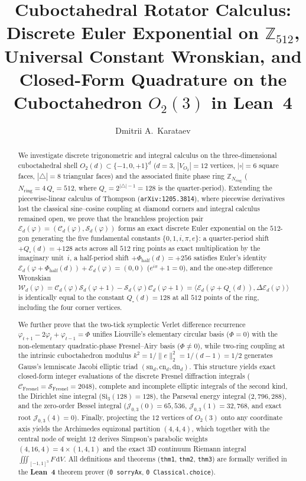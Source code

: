 \documentclass[11pt,a4paper]{article}
\title{\textbf{Cuboctahedral Rotator Calculus:\\ Discrete Euler Exponential on $\mathbb{Z}_{512}$, Universal Constant Wronskian, and Closed-Form Quadrature on the Cuboctahedron $O_2(3)$ in Lean~4}}
\author{Dmitrii A.~Karataev}
\date{}
\theoremstyle{plain}
\theoremstyle{definition}
\begin{document}
\maketitle

\begin{abstract}
We investigate discrete trigonometric and integral calculus on the three-dimensional cuboctahedral shell $O_2(d)\subset\{-1,0,+1\}^d$ ($d=3$, $|V_{O_2}|=12$ vertices, $|\square|=6$ square faces, $|\triangle|=8$ triangular faces) and the associated finite phase ring $\mathbb{Z}_{N_{\mathrm{ring}}}$ ($N_{\mathrm{ring}} = 4\,Q_\square = 512$, where $Q_\square = 2^{|\triangle|-1} = 128$ is the quarter-period). Extending the piecewise-linear calculus of Thompson (\texttt{arXiv:1205.3814}), where piecewise derivatives lost the classical sine--cosine coupling at diamond corners and integral calculus remained open, we prove that the branchless projection pair $\mathcal{E}_d(\varphi) = (\mathcal{C}_d(\varphi),\mathcal{S}_d(\varphi))$ forms an exact discrete Euler exponential on the $512$-gon generating the five fundamental constants $\{0,1,i,\pi,e\}$: a quarter-period shift $+Q_\square(d)=+128$ acts across all $512$ ring points as exact multiplication by the imaginary unit~$i$, a half-period shift $+\Phi_{\mathrm{half}}(d)=+256$ satisfies Euler's identity $\mathcal{E}_d(\varphi+\Phi_{\mathrm{half}}(d))+\mathcal{E}_d(\varphi)=(0,0)$ ($e^{i\pi}+1=0$), and the one-step difference Wronskian $\mathcal{W}_d(\varphi)=\mathcal{C}_d(\varphi)\mathcal{S}_d(\varphi+1)-\mathcal{S}_d(\varphi)\mathcal{C}_d(\varphi+1)=\langle \mathcal{E}_d(\varphi+Q_\square(d)),\Delta\mathcal{E}_d(\varphi)\rangle$ is identically equal to the constant $Q_\square(d)=128$ at all $512$ points of the ring, including the four corner vertices.

We further prove that the two-tick symplectic Verlet difference recurrence $\varphi_{t+1}-2\varphi_t+\varphi_{t-1}=\Phi$ unifies Liouville's elementary circular basis ($\Phi=0$) with the non-elementary quadratic-phase Fresnel--Airy basis ($\Phi\ne 0$), while two-ring coupling at the intrinsic cuboctahedron modulus $k^2 = 1/\|e\|_2^2 = 1/(d-1) = 1/2$ generates Gauss's lemniscate Jacobi elliptic triad $(\mathrm{sn}_d,\mathrm{cn}_d,\mathrm{dn}_d)$. This structure yields exact closed-form integer evaluations of the discrete Fresnel diffraction integrals ($\mathcal{C}_{\mathrm{Fresnel}}=\mathcal{S}_{\mathrm{Fresnel}}=2048$), complete and incomplete elliptic integrals of the second kind, the Dirichlet sine integral ($\mathrm{Si}_3(128)=128$), the Parseval energy integral ($2,796,288$), and the zero-order Bessel integral ($\mathcal{J}_{0,3}(0)=65,536$, $\mathcal{J}_{0,3}(1)=32,768$, and exact root $\mathcal{J}_{0,3}(4)=0$). Finally, projecting the $12$ vertices of $O_2(3)$ onto any coordinate axis yields the Archimedes equizonal partition $(4,4,4)$, which together with the central node of weight $12$ derives Simpson's parabolic weights $(4,16,4)=4\times(1,4,1)$ and the exact 3D continuum Riemann integral $\iiint_{[-1,1]^3} F\,\mathrm{d}V$. All definitions and theorems (\texttt{thm1}, \texttt{thm2}, \texttt{thm3}) are formally verified in the \textbf{Lean~4} theorem prover (\texttt{0 sorryAx}, \texttt{0 Classical.choice}).


\end{abstract}
\end{document}
